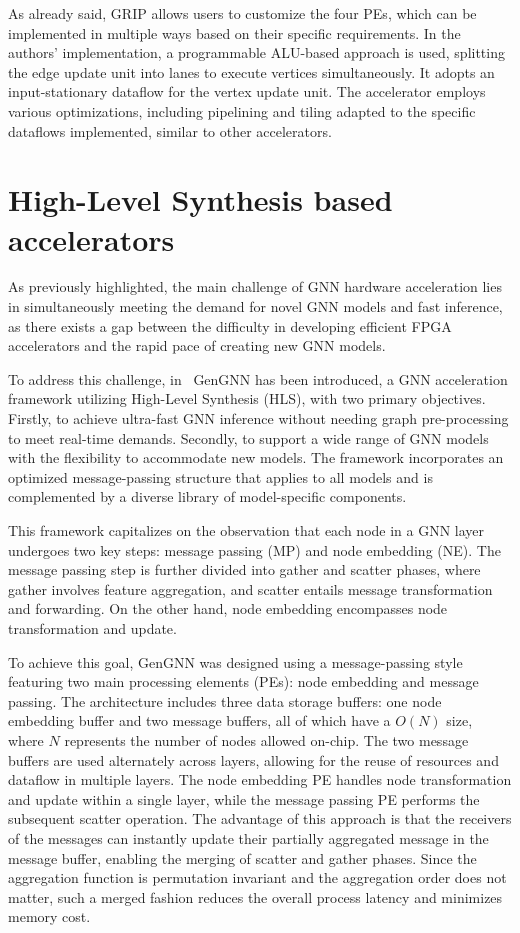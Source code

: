 As already said, GRIP allows users to customize the four PEs, which can be implemented in multiple ways based on their specific requirements.
In the authors' implementation, a programmable ALU-based approach is used, splitting the edge update unit into lanes to execute vertices simultaneously.
It adopts an input-stationary dataflow for the vertex update unit.
The accelerator employs various optimizations, including pipelining and tiling adapted to the specific dataflows implemented, similar to other accelerators.

\section{High-Level Synthesis based accelerators}
\label{sec:hls-accelerators}%

As previously highlighted, the main challenge of GNN hardware acceleration lies in simultaneously meeting the demand for novel GNN models and fast inference, as there exists a gap between the difficulty in developing efficient FPGA accelerators and the rapid pace of creating new GNN models.

To address this challenge, in~\cite{DBLP:journals/corr/abs-2201-08475} GenGNN has been introduced, a GNN acceleration framework utilizing High-Level Synthesis (HLS), with two primary objectives.
Firstly, to achieve ultra-fast GNN inference without needing graph pre-processing to meet real-time demands.
Secondly, to support a wide range of GNN models with the flexibility to accommodate new models.
The framework incorporates an optimized message-passing structure that applies to all models and is complemented by a diverse library of model-specific components.

This framework capitalizes on the observation that each node in a GNN layer undergoes two key steps: message passing (MP) and node embedding (NE). The message passing step is further divided into gather and scatter phases, where gather involves feature aggregation, and scatter entails message transformation and forwarding.
On the other hand, node embedding encompasses node transformation and update.

To achieve this goal, GenGNN was designed using a message-passing style featuring two main processing elements (PEs): node embedding and message passing.
The architecture includes three data storage buffers: one node embedding buffer and two message buffers, all of which have a $O(N)$ size, where $N$ represents the number of nodes allowed on-chip.
The two message buffers are used alternately across layers, allowing for the reuse of resources and dataflow in multiple layers.
The node embedding PE handles node transformation and update within a single layer, while the message passing PE performs the subsequent scatter operation.
The advantage of this approach is that the receivers of the messages can instantly update their partially aggregated message in the message buffer, enabling the merging of scatter and gather phases.
Since the aggregation function is permutation invariant and the aggregation order does not matter, such a merged fashion reduces the overall process latency and minimizes memory cost.

